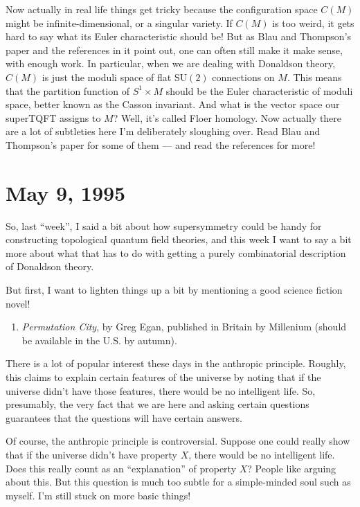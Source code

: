 \documentclass{article}
\def\tightlist{}
\begin{document}
Now actually in real life things get tricky because the configuration
space \(C(M)\) might be infinite-dimensional, or a singular variety. If
\(C(M)\) is too weird, it gets hard to say what its Euler characteristic
should be! But as Blau and Thompson's paper and the references in it
point out, one can often still make it make sense, with enough work. In
particular, when we are dealing with Donaldson theory, \(C(M)\) is just
the moduli space of flat \(\mathrm{SU}(2)\) connections on \(M\). This
means that the partition function of \(S^1\times M\) should be the Euler
characteristic of moduli space, better known as the Casson invariant.
And what is the vector space our superTQFT assigns to \(M\)? Well, it's
called Floer homology. Now actually there are a lot of subtleties here
I'm deliberately sloughing over. Read Blau and Thompson's paper for some
of them --- and read the references for more!



\hypertarget{week52}{%
\section{May 9, 1995}\label{week52}}

So, last ``week'', I said a bit about how supersymmetry could be handy
for constructing topological quantum field theories, and this week I
want to say a bit more about what that has to do with getting a purely
combinatorial description of Donaldson theory.

But first, I want to lighten things up a bit by mentioning a good
science fiction novel!

\begin{enumerate}
\def\labelenumi{\arabic{enumi})}
\tightlist
\item
  \emph{Permutation City}, by Greg Egan, published in Britain by
  Millenium (should be available in the U.S. by autumn).
\end{enumerate}

There is a lot of popular interest these days in the anthropic
principle. Roughly, this claims to explain certain features of the
universe by noting that if the universe didn't have those features,
there would be no intelligent life. So, presumably, the very fact that
we are here and asking certain questions guarantees that the questions
will have certain answers.

Of course, the anthropic principle is controversial. Suppose one could
really show that if the universe didn't have property \(X\), there would
be no intelligent life. Does this really count as an ``explanation'' of
property \(X\)? People like arguing about this. But this question is
much too subtle for a simple-minded soul such as myself. I'm still stuck
on more basic things!
\end{document}
